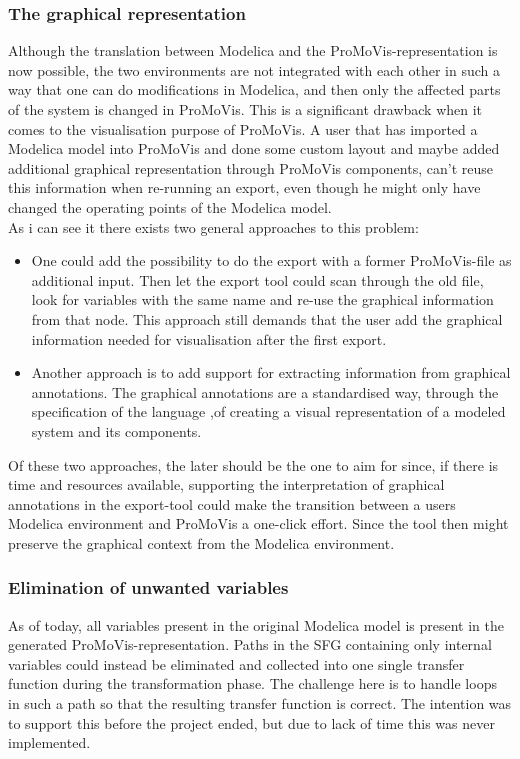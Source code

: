 \subsubsection{The graphical representation}
Although the translation between Modelica and the ProMoVis-representation is now possible, the two environments are not integrated with each other in such a way that one can do modifications in Modelica, and then only the affected parts of the system is changed in ProMoVis. This is a significant drawback when it comes to the visualisation purpose of ProMoVis. A user that has imported a Modelica model into ProMoVis and done some custom layout and maybe added additional graphical representation through ProMoVis components, can't reuse this information when re-running an export, even though he might only have changed the operating points of the Modelica model.\\\newline As i can see it there exists two general approaches to this problem: 
\begin{itemize}
\item One could add the possibility to do the export with a former ProMoVis-file as additional input. Then let the export tool could scan through the old file, look for variables with the same name and re-use the graphical information from that node. This approach still demands that the user add the graphical information needed for visualisation after the first export.
\item Another approach is to add support for extracting information from graphical annotations. The graphical annotations are a standardised way, through the specification of the language \cite{ModelicaSpec}\nocite{*},of creating a visual representation of a modeled system and its components.
\end{itemize}Of these two approaches, the later should be the one to aim for since, if there is time and resources available, supporting the interpretation of graphical annotations in the export-tool could make the transition between a users Modelica environment and ProMoVis a one-click effort. Since the tool then might preserve the graphical context from the Modelica environment.
\subsubsection{Elimination of unwanted variables}
As of today, all variables present in the original Modelica model is present in the generated ProMoVis-representation. Paths in the SFG containing only internal variables could instead be eliminated and collected into one single transfer function during the transformation phase. The challenge here is to handle loops in such a path so that the resulting transfer function is correct. The intention was to support this before the project ended, but due to lack of time this was never implemented. 

